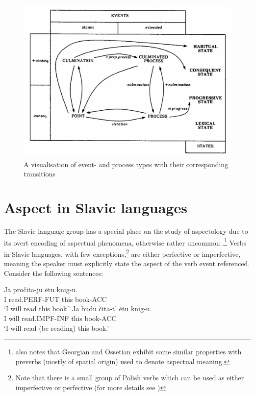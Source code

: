 \begin{figure}[h]
    \includegraphics[width=\textwidth]{img/moens_steedman_figure.png}
    \caption{A visualisation of event- and process types with their corresponding transitions \citep{moens-steedman-1988-temporal}}
    \label{fig:moens_steedman_figure}
\end{figure}

\section{Aspect in Slavic languages}
\label{sec:asp_in_slav_lang}
The Slavic language group has a special place on the study of aspectology due to its overt encoding of aspectual phenomena, otherwise rather uncommon \citep{slavstyleaspect}.\footnote{\citet{slavstyleaspect} also notes that Georgian and Ossetian exhibit some similar properties with preverbs (mostly of spatial origin) used to denote aspectual meaning.} Verbs in Slavic languages, with few exceptions,\footnote{Note that there is a small group of Polish verbs which can be used as either imperfective or perfective (for more details see \citet{kipka1990slavic})} are either perfective or imperfective, meaning the speaker must explicitly state the aspect of the verb event referenced. Consider the following sentences:

\begin{exe}
    \ex \gll Ja pročita-ju ėtu knig-u.\\
                I read.PERF-FUT this book-ACC\\
                \glt `I will read this book.'
    \label{sent:japrocit}
    \ex \gll Ja budu čita-t' ėtu knig-u.\\
            I will read.IMPF-INF this book-ACC\\
            \glt `I will read (be reading) this book.'
    \label{sent:jabuducitat}
\end{exe}

